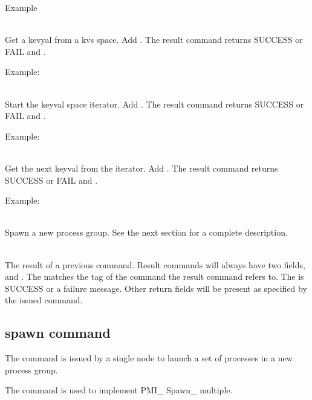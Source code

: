 \documentclass{article}
\begin{document}
\begin{description}
Example 
\item[\code{dbget}]\mbox{}\\
Get a kevyal from a kvs space.  Add .
The result command returns SUCCESS or FAIL and .

Example: 
\item[\code{dbfirst}]\mbox{}\\
Start the keyval space iterator.  Add .
The result command returns SUCCESS or FAIL and .

Example: 
\item[\code{dbnext}]\mbox{}\\
Get the next keyval from the iterator.  Add .
The result command returns SUCCESS or FAIL and .

Example: 
\item[\code{spawn}]\mbox{}\\
Spawn a new process group.  See the next section for a complete description.
\item[\code{result}]\mbox{}\\
The result of a previous command.  Result commands will always have two 
fields,  and .
The  matches the tag of the command the result command 
refers to.  The  is SUCCESS or a failure message. 
Other return fields will be present as specified by the issued command.
\end{description}

\subsection{spawn command}
The  command is issued by a single node to launch a set of 
processes in a new process group.

The  command is used to implement PMI\_ Spawn\_ multiple.
\end{document}
